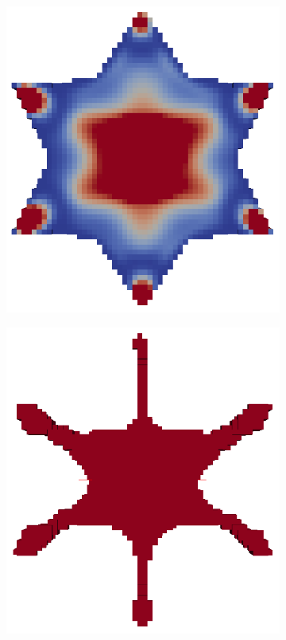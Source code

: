 \begin{figure}
\begin{subfigure}[c]{.24\linewidth}
  \includegraphics[width=\linewidth]{Pictures/TopOp/Star_Optimized2_Trans.png}
\end{subfigure}
\begin{subfigure}[c]{.24\linewidth}
\centering
  \includegraphics[width=\linewidth]{Pictures/TopOp/Star_Optimized4_Trans.png}

\end{subfigure}
\end{figure}
